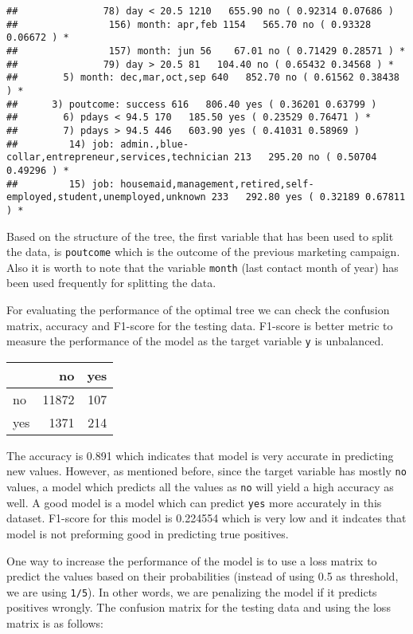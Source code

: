 \documentclass[
]{article}
\begin{document}
\begin{verbatim}
##               78) day < 20.5 1210   655.90 no ( 0.92314 0.07686 )  
##                156) month: apr,feb 1154   565.70 no ( 0.93328 0.06672 ) *
##                157) month: jun 56    67.01 no ( 0.71429 0.28571 ) *
##               79) day > 20.5 81   104.40 no ( 0.65432 0.34568 ) *
##        5) month: dec,mar,oct,sep 640   852.70 no ( 0.61562 0.38438 ) *
##      3) poutcome: success 616   806.40 yes ( 0.36201 0.63799 )  
##        6) pdays < 94.5 170   185.50 yes ( 0.23529 0.76471 ) *
##        7) pdays > 94.5 446   603.90 yes ( 0.41031 0.58969 )  
##         14) job: admin.,blue-collar,entrepreneur,services,technician 213   295.20 no ( 0.50704 0.49296 ) *
##         15) job: housemaid,management,retired,self-employed,student,unemployed,unknown 233   292.80 yes ( 0.32189 0.67811 ) *
\end{verbatim}

Based on the structure of the tree, the first variable that has been
used to split the data, is \texttt{poutcome} which is the outcome of the
previous marketing campaign. Also it is worth to note that the variable
\texttt{month} (last contact month of year) has been used frequently for
splitting the data.

For evaluating the performance of the optimal tree we can check the
confusion matrix, accuracy and F1-score for the testing data. F1-score
is better metric to measure the performance of the model as the target
variable \texttt{y} is unbalanced.

\begin{longtable}[]{@{}lrr@{}}
\toprule()
& no & yes \\
\midrule()
\endhead
no & 11872 & 107 \\
yes & 1371 & 214 \\
\bottomrule()
\end{longtable}

The accuracy is 0.891 which indicates that model is very accurate in
predicting new values. However, as mentioned before, since the target
variable has mostly \texttt{no} values, a model which predicts all the
values as \texttt{no} will yield a high accuracy as well. A good model
is a model which can predict \texttt{yes} more accurately in this
dataset. F1-score for this model is 0.224554 which is very low and it
indcates that model is not preforming good in predicting true positives.

One way to increase the performance of the model is to use a loss matrix
to predict the values based on their probabilities (instead of using 0.5
as threshold, we are using \texttt{1/5}). In other words, we are
penalizing the model if it predicts positives wrongly. The confusion
matrix for the testing data and using the loss matrix is as follows:
\end{document}
